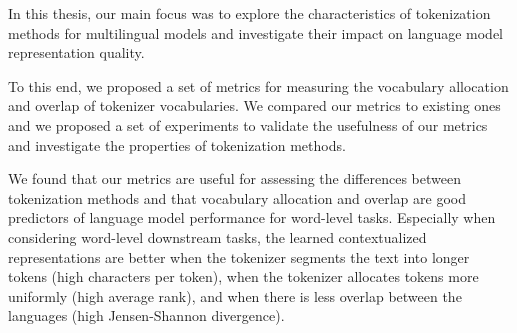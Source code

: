 




In this thesis, our main focus was to explore the characteristics of tokenization methods for multilingual models and investigate their impact on language model representation quality. 

To this end, we proposed a set of metrics for measuring the vocabulary allocation and overlap of tokenizer vocabularies. We compared our metrics to existing ones and we proposed a set of experiments to validate the usefulness of our metrics and investigate the properties of tokenization methods. 

We found that our metrics are useful for assessing the differences between tokenization methods and that vocabulary allocation and overlap are good predictors of language model performance for word-level tasks. Especially when considering word-level downstream tasks, the learned contextualized representations are better when the tokenizer segments the text into longer tokens (high characters per token), when the tokenizer allocates tokens more uniformly (high average rank), and when there is less overlap between the languages (high Jensen-Shannon divergence).

